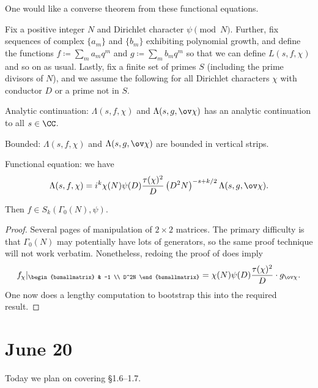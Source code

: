 \documentclass{article}
\begin{document}
One would like a converse theorem from these functional equations.
\begin{theorem}[Weil] \label{thm:weil-converse}
	Fix a positive integer $N$ and Dirichlet character $\psi\pmod N$. Further, fix sequences of complex $\{a_m\}$ and $\{b_m\}$ exhibiting polynomial growth, and define the functions $f\coloneqq\sum_{m}a_mq^m$ and $g\coloneqq\sum_mb_mq^m$ so that we can define $L(s,f,\chi)$ and so on as usual. Lastly, fix a finite set of primes $S$ (including the prime divisors of $N$), and we assume the following for all Dirichlet characters $\chi$ with conductor $D$ or a prime not in $S$.
	\begin{listalph}
		\item Analytic continuation: $\Lambda(s,f,\chi)$ and $\Lambda(s,g,\ov\chi)$ has an analytic continuation to all $s\in\CC$.
		\item Bounded: $\Lambda(s,f,\chi)$ and $\Lambda(s,g,\ov\chi)$ are bounded in vertical strips.
		\item Functional equation: we have
		\[\Lambda(s,f,\chi)=i^k\chi(N)\psi(D)\frac{\tau(\chi)^2}D\left(D^2N\right)^{-s+k/2}\Lambda(s,g,\ov\chi).\]
	\end{listalph}
	Then $f\in S_k(\Gamma_0(N),\psi)$.
\end{theorem}
\begin{proof}
	Several pages of manipulation of $2\times2$ matrices. The primary difficulty is that $\Gamma_0(N)$ may potentially have lots of generators, so the same proof technique will not work verbatim. Nonetheless, redoing the proof of  does imply
	\[f_\chi|_{\begin{bsmallmatrix}
		& -1 \\ D^2N
	\end{bsmallmatrix}}=\chi(N)\psi(D)\frac{\tau(\chi)^2}D\cdot g_{\ov\chi}.\]
	One now does a lengthy computation to bootstrap this into the required result.
\end{proof}

\section{June 20}
Today we plan on covering \S1.6--1.7.
\end{document}
